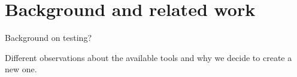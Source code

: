 \section{Background and related work}

Background on testing?\newline

Different observations about the available tools and why we decide to create a new one.